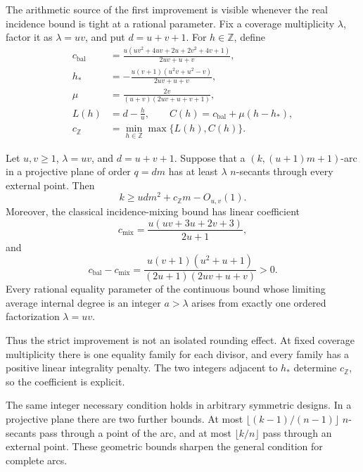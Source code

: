 The arithmetic source of the first improvement is visible whenever the real
incidence bound is tight at a rational parameter.  Fix a coverage multiplicity
\(\lambda\), factor it as
\(\lambda=uv\), and put \(d=u+v+1\).  For \(h\in\mathbb Z\), define
\begin{align}
 c_{\mathrm{bal}}
 &=\frac{u(uv^2+4uv+2u+2v^2+4v+1)}{2uv+u+v},\label{eq:c-balanced}\\
 h_*&=-\frac{u(v+1)(u^2v+u^2-v)}{2uv+u+v},\label{eq:h-star}\\
 \mu&=\frac{2v}{(u+v)(2uv+u+v+1)},\nonumber\\
 L(h)&=d-\frac hu,\qquad
 C(h)=c_{\mathrm{bal}}+\mu(h-h_*),\nonumber\\
 c_{\mathbb Z}&=\min_{h\in\mathbb Z}\max\{L(h),C(h)\}.
 \label{eq:c-integer}
\end{align}

\begin{theorem}\label{thm:factor-pair}
Let \(u,v\ge1\), \(\lambda=uv\), and \(d=u+v+1\).  Suppose that a
\((k,(u+1)m+1)\)-arc in a projective plane of order \(q=dm\) has at least
\(\lambda\) \(n\)-secants through every external point.  Then
\begin{equation}\label{eq:factor-pair-bound}
 k\ge udm^2+c_{\mathbb Z}m-O_{u,v}(1).
\end{equation}
Moreover, the classical incidence-mixing bound has linear coefficient
\[
 c_{\mathrm{mix}}=\frac{u(uv+3u+2v+3)}{2u+1},
\]
and
\begin{equation}\label{eq:strict-gap}
 c_{\mathrm{bal}}-c_{\mathrm{mix}}
 =\frac{u(v+1)(u^2+u+1)}{(2u+1)(2uv+u+v)}>0.
\end{equation}
Every rational equality parameter of the continuous bound whose limiting
average internal degree is an integer \(a>\lambda\) arises from exactly one
ordered factorization \(\lambda=uv\).
\end{theorem}

Thus the strict improvement is not an isolated rounding effect.  At fixed
coverage multiplicity there is one equality family for each divisor, and every
family has a positive linear integrality penalty.  The two integers adjacent
to \(h_*\) determine \(c_{\mathbb Z}\), so the coefficient is explicit.

The same integer necessary condition holds in arbitrary symmetric designs.
In a projective plane there are two further bounds.  At most
\(\lfloor(k-1)/(n-1)\rfloor\) \(n\)-secants pass through a point of the arc,
and at most \(\lfloor k/n\rfloor\) pass through an external point.  These
geometric bounds sharpen the general condition for complete arcs.

